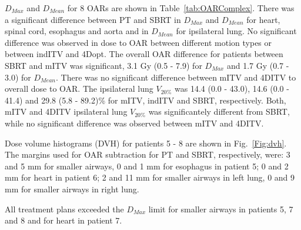 \documentclass[type=dr, dr=rernat, accentcolor=tud7b,colorbacktitle, bigchapter, openright, twoside, 12pt ]{tudthesis}
\begin{document}
$D_{Max}$ and $D_{Mean}$ for 8 OARs are shown in Table~\ref{tab:OARComplex}. There was a significant difference between PT and SBRT in $D_{Max}$ and $D_{Mean}$ for heart, spinal cord, esophagus and aorta and in $D_{Mean}$ for ipsilateral lung.
No significant difference was observed in dose to OAR between different motion types or between indITV and 4Dopt.
The overall OAR difference for patients between SBRT and mITV
was significant, 3.1 Gy (0.5 - 7.9)  for $D_{Max}$ and 1.7 Gy (0.7 - 3.0) for $D_{Mean}$. There was no significant difference between mITV and 4DITV to overall dose to OAR.
The ipsilateral lung $V_{20\%}$ was 14.4 (0.0 - 43.0), 14.6 (0.0 - 41.4) and 29.8 (5.8 - 89.2)\% for mITV, indITV and SBRT, respectively. Both, mITV and 4DITV ipsilateral lung $V_{20\%}$ was
significantely different from SBRT, while no significant difference was observed between mITV and 4DITV.

Dose volume histograms (DVH) for patients 5 - 8 are shown in Fig.~\ref{Fig:dvh}. The margins used for OAR subtraction for PT and SBRT, respectively, were:
3 and 5 mm for smaller airways, 0 and 1 mm for esophagus in patient 5; 
0 and 2 mm for heart in patient 6; 
2 and 11 mm for smaller airways in left lung, 0 and 9 mm for smaller airways in right lung.

All treatment plans exceeded the $D_{Max}$ limit for smaller airways in patients 5, 7 and 8 and for heart in patient 7.
\end{document}
